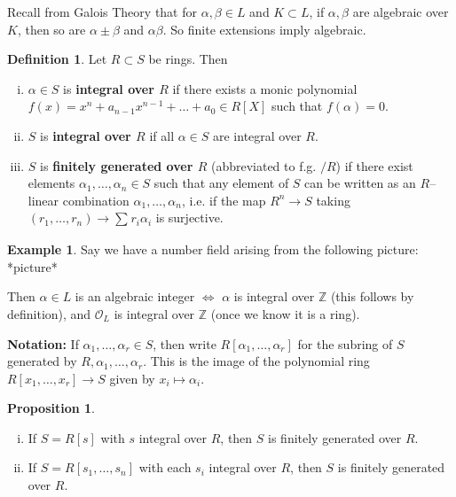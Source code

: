 \documentclass{article}
\theoremstyle{definition}
\newtheorem{prop}[theorem]{Proposition}
\newtheorem{example}{Example}[section]
\newtheorem{defn}{Definition}[section]
\begin{document}
Recall from Galois Theory that for $\alpha,\beta \in L$ and $K \subset L$, if $\alpha,\beta$ are algebraic over $K$, then so are $\alpha \pm \beta$ and $\alpha \beta$. So finite extensions imply algebraic.

\begin{defn}
    Let $R \subset S$ be rings. Then
    \begin{enumerate}[(i)]
        \item $\alpha \in S$ is \textbf{integral over $R$} if there exists a monic polynomial $f(x)=x^n + a_{n-1}x^{n-1} + \ldots + a_0 \in R[X]$ such that $f(\alpha)=0$.
        \item $S$ is \textbf{integral over $R$} if all $\alpha \in S$ are integral over $R$.
        \item $S$ is \textbf{finitely generated over $R$} (abbreviated to f.g. $/R$) if there exist elements $\alpha_1,\ldots,\alpha_n \in S$ such that any element of $S$ can be written as an $R$--linear combination $\alpha_1,\ldots,\alpha_n$, i.e. if the map $R^n \to S$ taking $(r_1,\ldots,r_n) \to \sum_{}^{} r_i \alpha_i$ is surjective. 
    \end{enumerate}
\end{defn}
\begin{example}
    Say we have a number field arising from the following picture: *picture*

    Then $\alpha \in L$ is an algebraic integer $\iff$ $\alpha$ is integral over $\mathbb{Z}$ (this follows by definition), and $\mathcal{O}_L$ is integral over $\mathbb{Z}$ (once we know it is a ring).
\end{example}
\textbf{Notation:} If $\alpha_1,\ldots,\alpha_r \in S$, then write $R[\alpha_1,\ldots,\alpha_r]$ for the subring of $S$ generated by $R,\alpha_1,\ldots,\alpha_r$. This is the image of the polynomial ring $R[x_1,\ldots,x_r] \to S$ given by $x_i \mapsto \alpha_i$.
\begin{prop}\label{1.3}
    \begin{enumerate}[(i)]
        \item If $S=R[s]$ with $s$ integral over $R$, then $S$ is finitely generated over $R$.
        \item If $S=R[s_1,\ldots,s_n]$ with each $s_i$ integral over $R$, then $S$ is finitely generated over $R$.
    \end{enumerate}
\end{prop}
\end{document}
